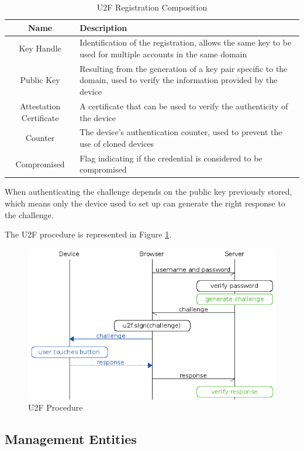 \begin{table}[ht]
  \begin{tabularx}{\textwidth}{@{}|c| *1{>{\centering\arraybackslash}X}@{}|}
    \hline
    \textbf{Name} & \textbf{Description} \\
    \hline\hline
    Key Handle & Identification of the registration, allows the same key to be used for multiple accounts in the same domain  \\
    \hline
    Public Key & Resulting from the generation of a key pair specific to the domain, used to verify the information provided by the device \\
    \hline
    Attestation Certificate & A certificate that can be used to verify the authenticity of the device \\
    \hline
    Counter & The device's authentication counter, used to prevent the use of cloned devices \\
    \hline
    Compromised & Flag indicating if the credential is considered to be compromised \\
    \hline
  \end{tabularx}
  \caption{U2F Registration Composition}
  \label{tab:u2f}
\end{table}

When authenticating the challenge depends on the public key previously stored, which means only the device used to set up can generate the right response to the challenge.

The U2F procedure is represented in Figure \ref{fig:yubi}.

\begin{figure}[ht]
 \centering
 \includegraphics[width=0.9\linewidth]{imgs/yubi.png}
 \caption{U2F Procedure \cite{yubi}}
 \label{fig:yubi}
\end{figure}

\subsection{Management Entities}

